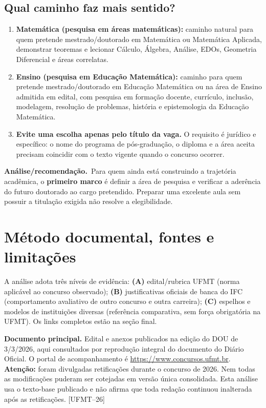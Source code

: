\documentclass[11pt,a4paper]{article}
\newcommand{\infer}{\textbf{Análise/recomendação.}~}
\newcommand{\fufmt}{\textsf{[UFMT--26]}}
\begin{document}
\subsection{Qual caminho faz mais sentido?}
\begin{enumerate}
\item \textbf{Matemática (pesquisa em áreas matemáticas):} caminho natural para quem pretende mestrado/doutorado em Matemática ou Matemática Aplicada, demonstrar teoremas e lecionar Cálculo, Álgebra, Análise, EDOs, Geometria Diferencial e áreas correlatas.
\item \textbf{Ensino (pesquisa em Educação Matemática):} caminho para quem pretende mestrado/doutorado em Educação Matemática ou na área de Ensino admitida em edital, com pesquisa em formação docente, currículo, inclusão, modelagem, resolução de problemas, história e epistemologia da Educação Matemática.
\item \textbf{Evite uma escolha apenas pelo título da vaga.} O requisito é jurídico e específico: o nome do programa de pós-graduação, o diploma e a área aceita precisam coincidir com o texto vigente quando o concurso ocorrer.
\end{enumerate}
\infer Para quem ainda está construindo a trajetória acadêmica, o \textbf{primeiro marco} é definir a área de pesquisa e verificar a aderência do futuro doutorado ao cargo pretendido. Preparar uma excelente aula sem possuir a titulação exigida não resolve a elegibilidade.

\section{Método documental, fontes e limitações}
A análise adota três níveis de evidência: \textbf{(A)} edital/rubrica UFMT (norma aplicável ao concurso observado); \textbf{(B)} justificativas oficiais de banca do IFC (comportamento avaliativo de outro concurso e outra carreira); \textbf{(C)} espelhos e modelos de instituições diversas (referência comparativa, sem força obrigatória na UFMT). Os links completos estão na seção final.

\textbf{Documento principal.} Edital e anexos publicados na edição do DOU de 3/3/2026, aqui consultados por reprodução integral do documento do Diário Oficial. O portal de acompanhamento é \url{https://www.concursos.ufmt.br}. \textbf{Atenção:} foram divulgadas retificações durante o concurso de 2026. Nem todas as modificações puderam ser cotejadas em versão única consolidada. Esta análise usa o texto-base publicado e não afirma que toda redação continuou inalterada após as retificações. \fufmt
\end{document}
